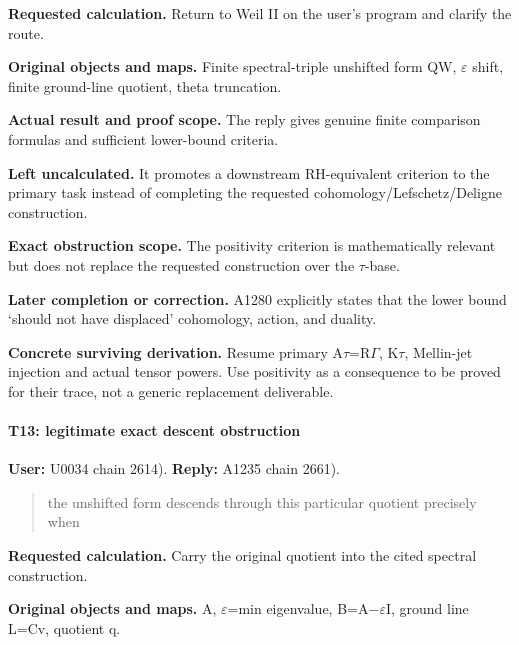 \textbf{Requested calculation.} Return to Weil II on the user's program
and clarify the route.

\textbf{Original objects and maps.} Finite spectral-triple unshifted
form QW, \allowbreak{}\ensuremath{ε}\allowbreak{} shift, finite
ground-line quotient, theta truncation.

\textbf{Actual result and proof scope.} The reply gives genuine finite
comparison formulas and sufficient lower-bound criteria.

\textbf{Left uncalculated.} It promotes a downstream RH-equivalent
criterion to the primary task instead of completing the requested
cohomology/Lefschetz/Deligne construction.

\textbf{Exact obstruction scope.} The positivity criterion is
mathematically relevant but does not replace the requested construction
over the \allowbreak{}\ensuremath{τ}\allowbreak{}-base.

\textbf{Later completion or correction.} A1280 explicitly states that
the lower bound `should not have displaced' cohomology, action, and
duality.

\textbf{Concrete surviving derivation.} Resume primary
A\allowbreak{}\ensuremath{τ}\allowbreak{}=R\allowbreak{}\ensuremath{Γ}\allowbreak{},
K\allowbreak{}\ensuremath{τ}\allowbreak{}, Mellin-jet injection and
actual tensor powers. Use positivity as a consequence to be proved for
their trace, not a generic replacement deliverable.

\paragraph{T13: legitimate exact descent
obstruction}\label{t13-legitimate-exact-descent-obstruction}

\textbf{User:} U0034
\protect{} chain 2614).
\textbf{Reply:} A1235
\protect{} chain 2661).

\begin{quote}
the unshifted form descends through this particular quotient precisely
when
\end{quote}

\textbf{Requested calculation.} Carry the original quotient into the
cited spectral construction.

\textbf{Original objects and maps.} A,
\allowbreak{}\ensuremath{ε}\allowbreak{}=min eigenvalue,
B=A\allowbreak{}\ensuremath{−}\allowbreak{}\allowbreak{}\ensuremath{ε}\allowbreak{}I,
ground line L=Cv, quotient q.

